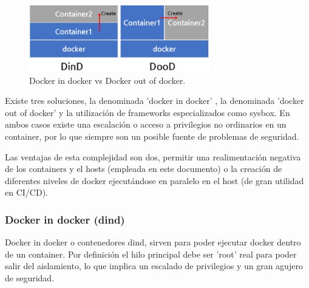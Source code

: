 \begin{figure}[!htb]
\begin{center}
\includegraphics[width=0.7\textwidth]{./figuras/did_vs_dood.png}
\caption{Docker in docker vs Docker out of docker.}
\label{F:did_vs_dood}
\end{center}
\end{figure}

Existe tres soluciones, la denominada 'docker in docker' \cite{c_dind}, la denominada 'docker out of docker' \cite{c_dood} y la utilización de frameworks especializados como sysbox\cite{c_docker_sysbox}. En ambos casos existe una escalación o acceso a privilegios no ordinarios en un container, por lo que siempre son un posible fuente de problemas de seguridad.

Las ventajas de esta complejidad son dos, permitir una realimentación negativa de los containers y el hosts (empleada en este documento) o la creación de diferentes niveles de docker ejecutándose en paralelo en el host (de gran utilidad en CI/CD).

\subsubsection{Docker in docker (dind)}
Docker in docker o contenedores dind\cite{c_dind}, sirven para poder ejecutar docker dentro de un container. Por definición el hilo principal debe ser 'root' real para poder salir del aislamiento, lo que implica un escalado de privilegios y un gran agujero de seguridad.


